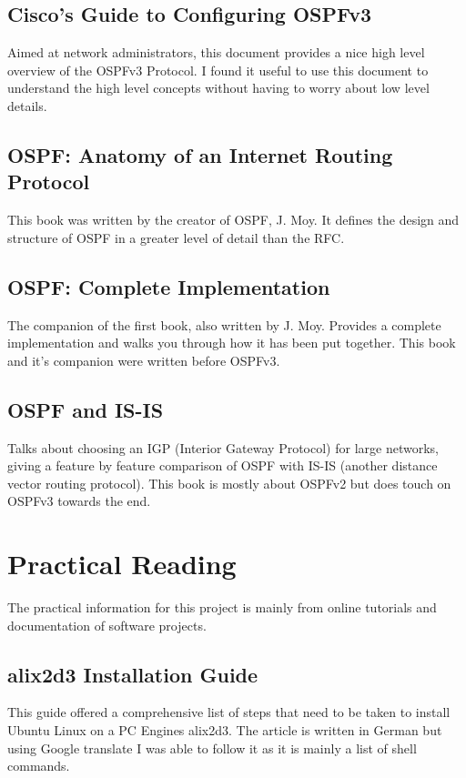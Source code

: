 \documentclass[12pt]{report}
\begin{document}
\subsection{Cisco's Guide to Configuring OSPFv3}
Aimed at network administrators, this document provides a nice high level
overview of the OSPFv3 Protocol\cite{CiscoOSPFv3Guide}. I found it useful to use
this document to understand the high level concepts without having to worry
about low level details.

\subsection{OSPF: Anatomy of an Internet Routing Protocol}
This book\cite{OSPFAIRP} was written by the creator of OSPF, J. Moy. It defines
the design and structure of OSPF in a greater level of detail than the RFC.

\subsection{OSPF: Complete Implementation}
The companion of the first book\cite{OSPFCI}, also written by J. Moy. Provides a
complete implementation and walks you through how it has been put together. This
book and it's companion were written before OSPFv3.

\subsection{OSPF and IS-IS}
Talks about choosing an IGP (Interior Gateway Protocol)
 for large networks, giving a
feature by feature comparison of OSPF with IS-IS
(another
distance vector routing protocol). This book is mostly about OSPFv2 but does
touch on OSPFv3 towards the end\cite{OSPFvsISIS}.

\section{Practical Reading}		
The practical information for this project is mainly from online tutorials and
documentation of software projects.  

\subsection{alix2d3 Installation Guide}
This guide\cite{germanGuide} offered a comprehensive list of steps that need to
be taken to install Ubuntu Linux on a PC Engines alix2d3\cite{alix2d3}.  The article is
written in German but using Google translate I was able to follow it as it is
mainly a list of shell commands.
\end{document}
